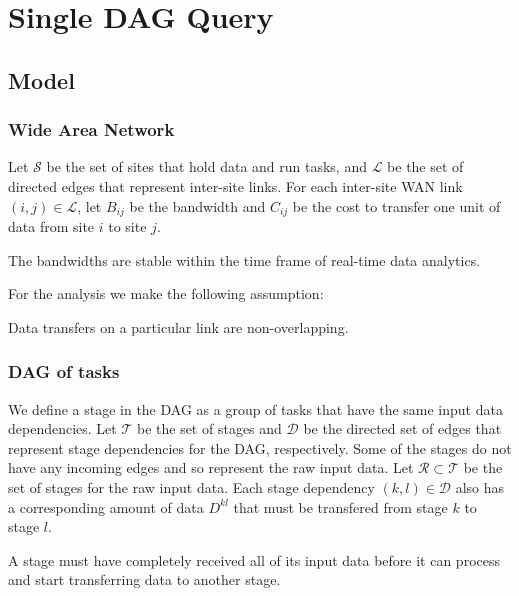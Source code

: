 \section{Single DAG Query}

\subsection{Model}

\subsubsection*{Wide Area Network}

Let $\mathcal{S}$ be the set of sites that hold data and run tasks, and $\mathcal{L}$ be the set of directed edges that represent inter-site links.
For each inter-site WAN link $(i,j)\in\mathcal{L}$, let $B_{ij}$ be the bandwidth and $C_{ij}$ be the cost to transfer one unit of data from site $i$ to site $j$.
\begin{assumption}
	The bandwidths are stable within the time frame of real-time data analytics.
\end{assumption} 

For the analysis we make the following assumption:
\begin{assumption}
	Data transfers on a particular link are non-overlapping.
\end{assumption}

\subsubsection*{DAG of tasks}

We define a stage in the DAG as a group of tasks that have the same input data dependencies.
Let $\mathcal{T}$ be the set of stages and $\mathcal{D}$ be the directed set of edges that represent stage dependencies for the DAG, respectively.
Some of the stages do not have any incoming edges and so represent the raw input data.
Let $\mathcal{R}\subset\mathcal{T}$ be the set of stages for the raw input data.
Each stage dependency $(k,l)\in\mathcal{D}$ also has a corresponding amount of data $D^{kl}$ that must be transfered from stage $k$ to stage $l$.

\begin{assumption}
	A stage must have completely received all of its input data before it can process and start transferring data to another stage.
\end{assumption}

